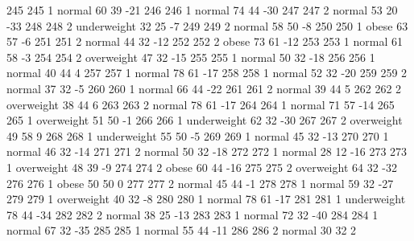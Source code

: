 \begin{Schunk}
\begin{Soutput}
		245         245   1      normal  60         39          -21
		246         246   1      normal  74         44          -30
		247         247   2      normal  53         20          -33
		248         248   2 underweight  32         25           -7
		249         249   2      normal  58         50           -8
		250         250   1       obese  63         57           -6
		251         251   2      normal  44         32          -12
		252         252   2       obese  73         61          -12
		253         253   1      normal  61         58           -3
		254         254   2  overweight  47         32          -15
		255         255   1      normal  50         32          -18
		256         256   1      normal  40         44            4
		257         257   1      normal  78         61          -17
		258         258   1      normal  52         32          -20
		259         259   2      normal  37         32           -5
		260         260   1      normal  66         44          -22
		261         261   2      normal  39         44            5
		262         262   2  overweight  38         44            6
		263         263   2      normal  78         61          -17
		264         264   1      normal  71         57          -14
		265         265   1  overweight  51         50           -1
		266         266   1 underweight  62         32          -30
		267         267   2  overweight  49         58            9
		268         268   1 underweight  55         50           -5
		269         269   1      normal  45         32          -13
		270         270   1      normal  46         32          -14
		271         271   2      normal  50         32          -18
		272         272   1      normal  28         12          -16
		273         273   1  overweight  48         39           -9
		274         274   2       obese  60         44          -16
		275         275   2  overweight  64         32          -32
		276         276   1       obese  50         50            0
		277         277   2      normal  45         44           -1
		278         278   1      normal  59         32          -27
		279         279   1  overweight  40         32           -8
		280         280   1      normal  78         61          -17
		281         281   1 underweight  78         44          -34
		282         282   2      normal  38         25          -13
		283         283   1      normal  72         32          -40
		284         284   1      normal  67         32          -35
		285         285   1      normal  55         44          -11
		286         286   2      normal  30         32            2

\end{Soutput}
\end{Schunk}
